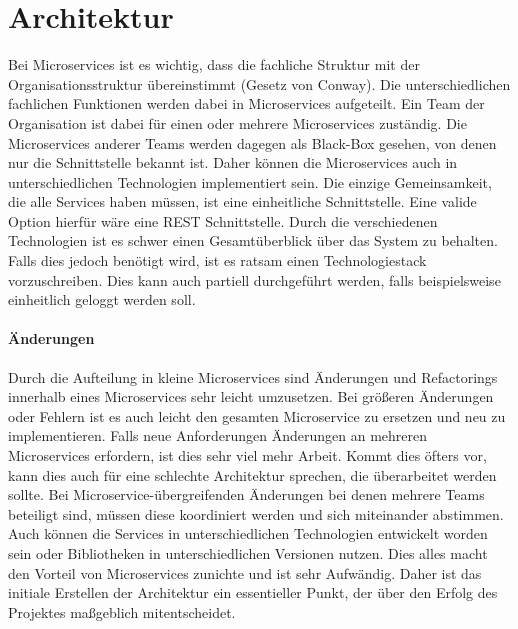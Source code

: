 \section{Architektur} \label{ch:Architektur}
Bei Microservices ist es wichtig, dass die fachliche Struktur mit der Organisationsstruktur übereinstimmt (Gesetz von Conway). Die unterschiedlichen fachlichen Funktionen werden dabei in Microservices aufgeteilt. Ein Team der Organisation ist dabei für einen oder mehrere Microservices zuständig. Die Microservices anderer Teams werden dagegen als Black-Box gesehen, von denen nur die Schnittstelle bekannt ist. Daher können die Microservices auch in unterschiedlichen Technologien implementiert sein. Die einzige Gemeinsamkeit, die alle Services haben müssen, ist eine einheitliche Schnittstelle. Eine valide Option hierfür wäre eine REST Schnittstelle. \newline
Durch die verschiedenen Technologien ist es schwer einen Gesamtüberblick über das System zu behalten. Falls dies jedoch benötigt wird, ist es ratsam einen Technologiestack vorzuschreiben. Dies kann auch partiell durchgeführt werden, falls beispielsweise einheitlich geloggt werden soll. \paragraph{Änderungen}
Durch die Aufteilung in kleine Microservices sind Änderungen und Refactorings innerhalb eines Microservices sehr leicht umzusetzen. Bei größeren Änderungen oder Fehlern ist es auch leicht den gesamten Microservice zu ersetzen und neu zu implementieren. \newline
Falls neue Anforderungen Änderungen an mehreren Microservices erfordern, ist dies sehr viel mehr Arbeit. Kommt dies öfters vor, kann dies auch für eine schlechte Architektur sprechen, die überarbeitet werden sollte. Bei Microservice-übergreifenden Änderungen bei denen mehrere Teams beteiligt sind, müssen diese koordiniert werden und sich miteinander abstimmen. Auch können die Services in unterschiedlichen Technologien entwickelt worden sein oder Bibliotheken in unterschiedlichen Versionen nutzen. Dies alles macht den Vorteil von Microservices zunichte und ist sehr Aufwändig. Daher ist das initiale Erstellen der Architektur ein essentieller Punkt, der über den Erfolg des Projektes maßgeblich mitentscheidet. \cite{microservices}

